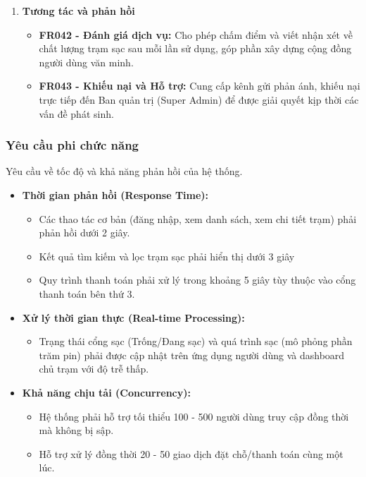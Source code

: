 \begin{enumerate}[label=\textbf{\alph*)}]
\begin{itemize}
        \item \textbf{FR041 - Thông báo tự động:} Gửi thông báo đẩy (Push Notification) ngay khi quá trình sạc hoàn tất hoặc khi có sự cố phát sinh.
    \end{itemize}
    \item \textbf{Tương tác và phản hồi}
    \begin{itemize}
        \item \textbf{FR042 - Đánh giá dịch vụ:} Cho phép chấm điểm và viết nhận xét về chất lượng trạm sạc sau mỗi lần sử dụng, góp phần xây dựng cộng đồng người dùng văn minh.
        \item \textbf{FR043 - Khiếu nại và Hỗ trợ:} Cung cấp kênh gửi phản ánh, khiếu nại trực tiếp đến Ban quản trị (Super Admin) để được giải quyết kịp thời các vấn đề phát sinh.
    \end{itemize}
\end{enumerate}
 
\subsubsection{Yêu cầu phi chức năng}

Yêu cầu về tốc độ và khả năng phản hồi của hệ thống.
\begin{itemize}
    \item \textbf{Thời gian phản hồi (Response Time):}
    \begin{itemize}
        \item Các thao tác cơ bản (đăng nhập, xem danh sách, xem chi tiết trạm) phải phản hồi dưới 2 giây.
        \item Kết quả tìm kiếm và lọc trạm sạc phải hiển thị dưới 3 giây
        \item Quy trình thanh toán phải xử lý trong khoảng 5 giây tùy thuộc vào cổng thanh toán bên thứ 3.
    \end{itemize}
    \item \textbf{Xử lý thời gian thực (Real-time Processing):}
    \begin{itemize}
        \item Trạng thái cổng sạc (Trống/Đang sạc) và quá trình sạc (mô phỏng phần trăm pin) phải được cập nhật trên ứng dụng người dùng và dashboard chủ trạm với độ trễ thấp.
    \end{itemize}
    \item \textbf{Khả năng chịu tải (Concurrency):}
    \begin{itemize}
        \item Hệ thống phải hỗ trợ tối thiểu 100 - 500 người dùng truy cập đồng thời mà không bị sập.
        \item Hỗ trợ xử lý đồng thời 20 - 50 giao dịch đặt chỗ/thanh toán cùng một lúc.
    \end{itemize}
\end{itemize}

